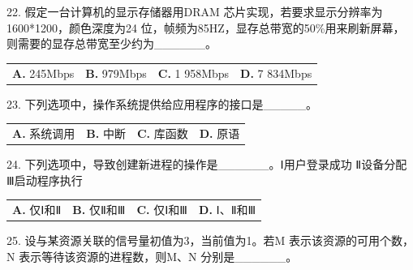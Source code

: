 \documentclass[UTF8,11pt]{ctexart}
\begin{document}
22. 假定一台计算机的显示存储器用DRAM 芯片实现，若要求显示分辨率为1600*1200，颜色深度为24 位，帧频为85HZ，显存总带宽的50\%用来刷新屏幕，则需要的显存总带宽至少约为\_\_\_\_\_\_。


\begin{center}\begin{tabular}{>{\raggedright\arraybackslash}p{\dimexpr(\linewidth-8\tabcolsep)/4\relax}>{\raggedright\arraybackslash}p{\dimexpr(\linewidth-8\tabcolsep)/4\relax}>{\raggedright\arraybackslash}p{\dimexpr(\linewidth-8\tabcolsep)/4\relax}>{\raggedright\arraybackslash}p{\dimexpr(\linewidth-8\tabcolsep)/4\relax}}
\textbf{A.} 245Mbps & \textbf{B.} 979Mbps & \textbf{C.} 1 958Mbps & \textbf{D.} 7 834Mbps\\[.35em]\end{tabular}\end{center}

23. 下列选项中，操作系统提供给应用程序的接口是\_\_\_\_\_。


\begin{center}\begin{tabular}{>{\raggedright\arraybackslash}p{\dimexpr(\linewidth-8\tabcolsep)/4\relax}>{\raggedright\arraybackslash}p{\dimexpr(\linewidth-8\tabcolsep)/4\relax}>{\raggedright\arraybackslash}p{\dimexpr(\linewidth-8\tabcolsep)/4\relax}>{\raggedright\arraybackslash}p{\dimexpr(\linewidth-8\tabcolsep)/4\relax}}
\textbf{A.} 系统调用 & \textbf{B.} 中断 & \textbf{C.} 库函数 & \textbf{D.} 原语\\[.35em]\end{tabular}\end{center}

24. 下列选项中，导致创建新进程的操作是\_\_\_\_\_\_。Ⅰ用户登录成功 Ⅱ设备分配 Ⅲ启动程序执行


\begin{center}\begin{tabular}{>{\raggedright\arraybackslash}p{\dimexpr(\linewidth-8\tabcolsep)/4\relax}>{\raggedright\arraybackslash}p{\dimexpr(\linewidth-8\tabcolsep)/4\relax}>{\raggedright\arraybackslash}p{\dimexpr(\linewidth-8\tabcolsep)/4\relax}>{\raggedright\arraybackslash}p{\dimexpr(\linewidth-8\tabcolsep)/4\relax}}
\textbf{A.} 仅Ⅰ和Ⅱ & \textbf{B.} 仅Ⅱ和Ⅲ & \textbf{C.} 仅Ⅰ和Ⅲ & \textbf{D.} Ⅰ、Ⅱ和Ⅲ\\[.35em]\end{tabular}\end{center}

25. 设与某资源关联的信号量初值为3，当前值为1。若M 表示该资源的可用个数，N 表示等待该资源的进程数，则M、N 分别是\_\_\_\_\_\_。
\end{document}
